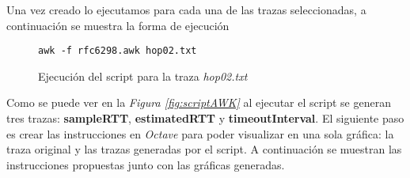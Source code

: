 \noindent Una vez creado lo ejecutamos para cada una de las trazas seleccionadas, a continuaci\'on se muestra la forma de
ejecuci\'on 

\begin{figure}[H]
    \centering
    \begin{lstlisting}[frame=single, breaklines=true, basicstyle=\footnotesize\ttfamily, breakatwhitespace=false, 
        columns=flexible, tabsize=2, showstringspaces=fals] 
        awk -f rfc6298.awk hop02.txt
    \end{lstlisting}
    \caption{Ejecuci\'on del script para la traza \textit{hop02.txt}}
    \label{fig:execScript}
\end{figure}

\noindent Como se puede ver en la \textit{Figura \ref*{fig:scriptAWK}} al ejecutar el script se generan tres trazas: 
\textbf{sampleRTT}, \textbf{estimatedRTT} y \textbf{timeoutInterval}. El siguiente paso es crear las instrucciones en 
\textit{Octave} para poder visualizar en una sola gr\'afica: la traza original y las trazas generadas por el script. 
A continuaci\'on se muestran las instrucciones propuestas junto con las gr\'aficas generadas.

